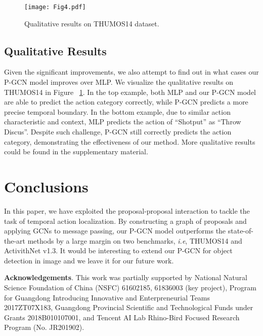 \documentclass[10pt,twocolumn,letterpaper]{article}
\def\ie{\emph{i.e}\onedot} \def\Ie{\emph{I.e}\onedot}
\begin{document}
	\begin{figure}[!t]
		\centering
		\texttt{[image: Fig4.pdf]}
		\caption{Qualitative results on THUMOS14 dataset.}
			 	\vspace{-0.3cm}
		\label{Fig:qualitative}
	\end{figure}
	
	\subsection{Qualitative Results}
	
	Given the significant improvements, we also attempt to find out in what cases our P-GCN model improves over MLP. We visualize the qualitative results on THUMOS14 in Figure ~\ref{Fig:qualitative}. In the top example, both MLP and our P-GCN model are able to predict the action category correctly, while P-GCN predicts a more precise temporal boundary. In the bottom example, due to similar action characteristic and context, MLP predicts the action of ``Shotput'' as ``Throw Discus''. Despite such challenge, P-GCN still correctly predicts the action category, demonstrating the effectiveness of our method. More qualitative results could be found in the supplementary material.
	
	\section{Conclusions}
	
	In this paper, we have exploited the proposal-proposal interaction to tackle the task of temporal action localization. By constructing a graph of proposals and applying GCNs to message passing, our P-GCN model outperforms the state-of-the-art methods by a large margin on two benchmarks, \ie, THUMOS14 and ActivithNet v1.3. It would be interesting to extend our P-GCN for object detection in image and we leave it for our future work.
	
	\footnotesize 
	{\flushleft \bf Acknowledgements}. This work was partially supported by National Natural Science Foundation of China (NSFC) 61602185, 61836003 (key project),
	Program for Guangdong Introducing Innovative and Enterpreneurial Teams 2017ZT07X183, Guangdong Provincial Scientific and Technological Funds under Grants 2018B010107001, and Tencent AI Lab Rhino-Bird Focused Research Program (No. JR201902).
	
\small
\end{document}
